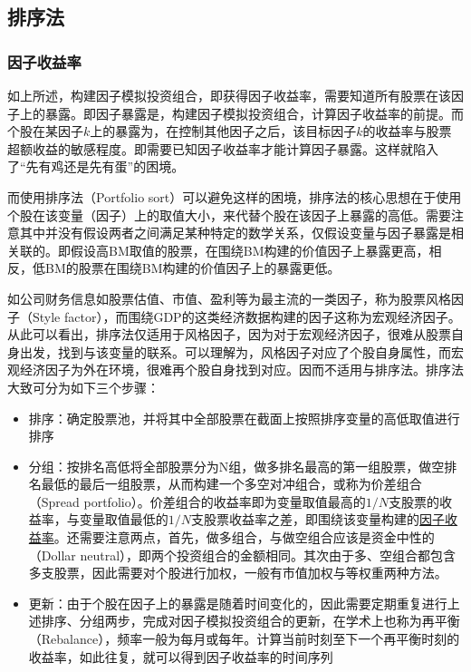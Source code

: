 \documentclass[11pt]{article}
\begin{document}
\subsection{排序法}

\subsubsection{因子收益率}

如上所述，构建因子模拟投资组合，即获得因子收益率，需要知道所有股票在该因子上的暴露。即因子暴露是，构建因子模拟投资组合，计算因子收益率的前提。而个股在某因子$k$上的暴露为，在控制其他因子之后，该目标因子$k$的收益率与股票超额收益的敏感程度。即需要已知因子收益率才能计算因子暴露。这样就陷入了“先有鸡还是先有蛋”的困境。

而使用排序法（Portfolio sort）可以避免这样的困境，排序法的核心思想在于使用个股在该变量（因子）上的取值大小，来代替个股在该因子上暴露的高低。需要注意其中并没有假设两者之间满足某种特定的数学关系，仅假设变量与因子暴露是相关联的。即假设高BM取值的股票，在围绕BM构建的价值因子上暴露更高，相反，低BM的股票在围绕BM构建的价值因子上的暴露更低。

如公司财务信息如股票估值、市值、盈利等为最主流的一类因子，称为股票风格因子（Style factor），而围绕GDP的这类经济数据构建的因子这称为宏观经济因子。从此可以看出，排序法仅适用于风格因子，因为对于宏观经济因子，很难从股票自身出发，找到与该变量的联系。可以理解为，风格因子对应了个股自身属性，而宏观经济因子为外在环境，很难再个股自身找到对应。因而不适用与排序法。排序法大致可分为如下三个步骤：
\begin{itemize}
    \item 排序：确定股票池，并将其中全部股票在截面上按照排序变量的高低取值进行排序
    \item 分组：按排名高低将全部股票分为N组，做多排名最高的第一组股票，做空排名最低的最后一组股票，从而构建一个多空对冲组合，或称为价差组合（Spread portfolio）。价差组合的收益率即为变量取值最高的$1/N$支股票的收益率，与变量取值最低的$1/N$支股票收益率之差，即围绕该变量构建的\uline{因子收益率}。还需要注意两点，首先，做多组合，与做空组合应该是资金中性的（Dollar neutral），即两个投资组合的金额相同。其次由于多、空组合都包含多支股票，因此需要对个股进行加权，一般有市值加权与等权重两种方法。
    \item 更新：由于个股在因子上的暴露是随着时间变化的，因此需要定期重复进行上述排序、分组两步，完成对因子模拟投资组合的更新，在学术上也称为再平衡（Rebalance），频率一般为每月或每年。计算当前时刻至下一个再平衡时刻的收益率，如此往复，就可以得到因子收益率的时间序列
\end{itemize}
\end{document}
